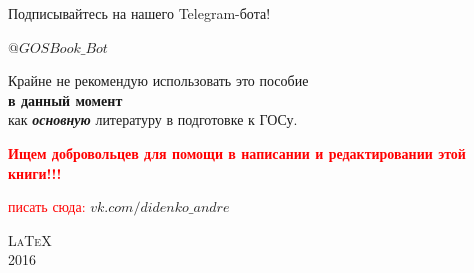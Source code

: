 \mbox{}

\textcolor{PersianBlue}{\huge \textsf{Подписывайтесь на нашего Telegram-бота!}} 

\vspace*{0.5\baselineskip} 

\href{https://t.me/GOSBook_Bot}{\textcolor{Purplemountainmajesty}{$@GOSBook\_Bot$}}

\mbox{}

Крайне не рекомендую использовать это пособие\\ {\textbf{в данный момент}} \\как \textit{\textbf{основную}} литературу в подготовке к ГОСу. \\

\mbox{}

\textcolor{red}{\Large \textbf{
Ищем добровольцев для помощи в написании и редактировании этой книги!!!}}

\vspace*{0.3\baselineskip} 

\textcolor{red}{
писать сюда: \href{https://vk.com/didenko_andre}{ \textcolor{Purplemountainmajesty}{$vk.com/didenko\_andre$}}
}

\mbox{}

\vfill
{\LARGE\scshape \LaTeX}\\[\baselineskip]
{\LARGE\scshape 2016}\par
\restoregeometry
\endgroup
\newpage